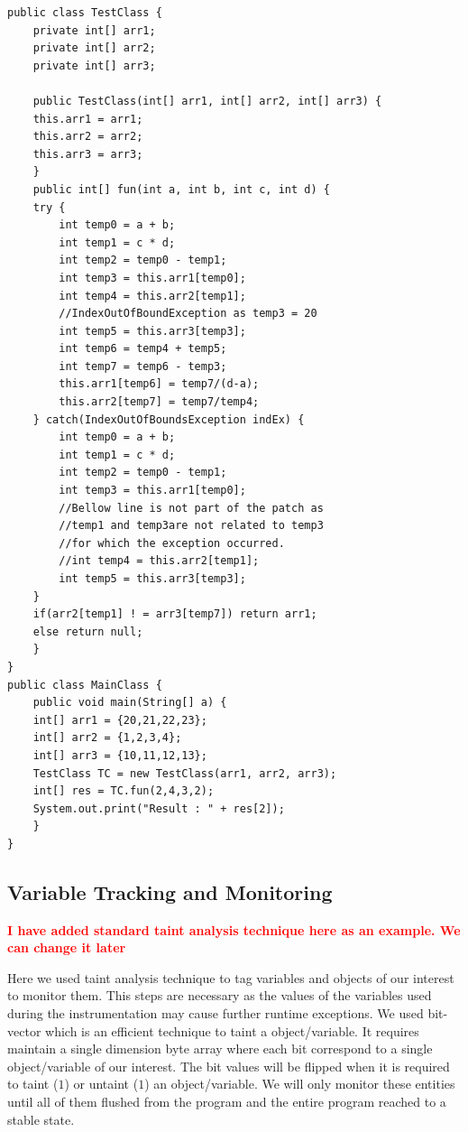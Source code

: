  

\lstset{language=Java, caption=patching code slice based on exception type,
label=patchingexample1}

\begin{lstlisting}[countblanklines=false]
public class TestClass {
    private int[] arr1;
    private int[] arr2;
    private int[] arr3;

    public TestClass(int[] arr1, int[] arr2, int[] arr3) {
	this.arr1 = arr1;
	this.arr2 = arr2;
	this.arr3 = arr3;
    }
    public int[] fun(int a, int b, int c, int d) {
	try {
	    int temp0 = a + b;
	    int temp1 = c * d;
	    int temp2 = temp0 - temp1;
	    int temp3 = this.arr1[temp0];
	    int temp4 = this.arr2[temp1];
	    //IndexOutOfBoundException as temp3 = 20
	    int temp5 = this.arr3[temp3];
	    int temp6 = temp4 + temp5;
	    int temp7 = temp6 - temp3;
	    this.arr1[temp6] = temp7/(d-a);
	    this.arr2[temp7] = temp7/temp4;
	} catch(IndexOutOfBoundsException indEx) {
	    int temp0 = a + b;
	    int temp1 = c * d;
	    int temp2 = temp0 - temp1;
	    int temp3 = this.arr1[temp0];
	    //Bellow line is not part of the patch as
	    //temp1 and temp3are not related to temp3
	    //for which the exception occurred.
	    //int temp4 = this.arr2[temp1];
	    int temp5 = this.arr3[temp3];
	}
	if(arr2[temp1] ! = arr3[temp7]) return arr1;
	else return null;
    }
}
public class MainClass {
    public void main(String[] a) {
	int[] arr1 = {20,21,22,23};
	int[] arr2 = {1,2,3,4};
	int[] arr3 = {10,11,12,13};
	TestClass TC = new TestClass(arr1, arr2, arr3);
	int[] res = TC.fun(2,4,3,2);
	System.out.print("Result : " + res[2]);
    }    
}
\end{lstlisting}

\subsection{Variable Tracking and Monitoring}
\label{subsec:taint}
\textcolor{red}{\textbf{I have added standard taint analysis technique here as
an example. We can change it later}}\newline


Here we used taint analysis technique to tag variables and objects of our
interest to monitor them.
This steps are necessary as the values of the variables used during the
instrumentation may cause further runtime exceptions.
We used bit-vector which is an efficient technique to taint a object/variable.
It requires maintain a single dimension byte array where each bit correspond to
a single object/variable of our interest.
The bit values will be flipped when it is required to taint ($1$) or untaint
($1$) an object/variable.
We will only monitor these entities until all of them flushed from the program
and the entire program reached to a stable state.






